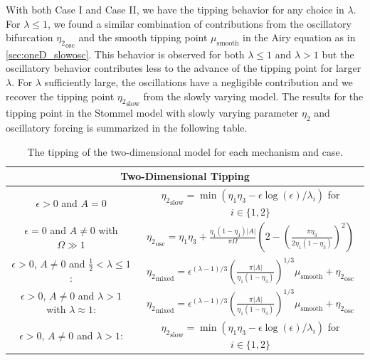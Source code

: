 With both Case I and Case II, we have the tipping behavior for any choice in $\lambda$. For $\lambda\le1$, we found a similar combination of contributions from the oscillatory bifurcation ${\eta_2}_{\text{osc}}$ and the smooth tipping point ${\mu}_{\text{smooth}}$ in the Airy equation as in \autoref{sec:oneD_slowosc}. This behavior is observed for both $\lambda\le 1$ and $\lambda>1$ but the oscillatory behavior contributes less to the advance of the tipping point for larger $\lambda$. For $\lambda$ sufficiently large, the oscillations have a negligible contribution and we recover the tipping point ${\eta_2}_{\text{slow}}$ from the slowly varying model. The results for the tipping point in the Stommel model with slowly varying parameter $\eta_2$ and oscillatory forcing is summarized in the following table.

\begin{table}[H]
\begin{center}
\begin{tabular}{|c|c|}
\hline 
 \multicolumn{2}{|c|}{Two-Dimensional Tipping} \\ 
\hline
$\epsilon>0$ and $A=0$ & ${\eta_2}_{\text{slow}}=\min(\eta_1\eta_3 -\epsilon\log(\epsilon)/\lambda_i)$ for $i\in\{1,2\}$ \\ 
\hline 
$\epsilon=0$ and $A\not=0$ with $\Omega\gg 1$ & ${\eta_2}_{\text{osc}}=\eta_1\eta_3+\frac{\eta_1(1-\eta_3)|A|}{\pi\Omega}\left(2-\left(\frac{\pi\eta_3}{2\eta_1(1-\eta_3)}\right)^2\right)$ \\ 
\hline 
$\epsilon>0$, $A\not=0$ and $\frac{1}{2}<\lambda\le 1$: & ${\eta_2}_{\text{mixed}}=\epsilon^{(\lambda-1)/3}\left(\frac{\pi |A|}{\eta_1(1-\eta_3)}\right)^{1/3} \mu_{\text{smooth}}+{\eta_2}_{\text{osc}}$ \\ 
\hline 
$\epsilon>0$, $A\not=0$ and $\lambda >1$ with $\lambda \approx 1$: &${\eta_2}_{\text{mixed}}=\epsilon^{(\lambda-1)/3}\left(\frac{\pi |A|}{\eta_1(1-\eta_3)}\right)^{1/3} \mu_{\text{smooth}}+{\eta_2}_{\text{osc}}$ \\ 
\hline 
$\epsilon>0$, $A\not=0$ and $\lambda>1$:
 & ${\eta_2}_{\text{slow}}=\min(\eta_1\eta_3 -\epsilon\log(\epsilon)/\lambda_i)$ for $i\in\{1,2\}$ \\
\hline
\end{tabular} 
\caption{The tipping of the two-dimensional model for each mechanism and case.}
\end{center}
\end{table}

